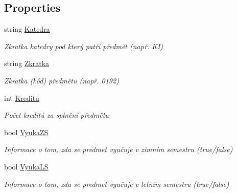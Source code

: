 \subsection*{Properties}
\begin{DoxyCompactItemize}
\item 
string \hyperlink{class_analyza_rozvrhu_1_1_s_t_a_g___classes_1_1_predmet_a8a428f94044d4bc4d27a93de9371af00}{Katedra}
\begin{DoxyCompactList}\small\item\em Zkratka katedry pod který patří předmět (např. KI) \end{DoxyCompactList}\item 
string \hyperlink{class_analyza_rozvrhu_1_1_s_t_a_g___classes_1_1_predmet_a8a979ce2d4b9f29e01189c3ccfff9dcb}{Zkratka}
\begin{DoxyCompactList}\small\item\em Zkratka (kód) předmětu (např. 0192) \end{DoxyCompactList}\item 
int \hyperlink{class_analyza_rozvrhu_1_1_s_t_a_g___classes_1_1_predmet_a6e33e18dd5aa2fb8f84c5a8add8ec951}{Kreditu}
\begin{DoxyCompactList}\small\item\em Počet kreditů za splnění předmětu \end{DoxyCompactList}\item 
bool \hyperlink{class_analyza_rozvrhu_1_1_s_t_a_g___classes_1_1_predmet_a05d470dbc4731440c47f20b49dffdc34}{Vyuka\+ZS}
\begin{DoxyCompactList}\small\item\em Informace o tom, zda se predmet vyučuje v zimním semestru (true/false) \end{DoxyCompactList}\item 
bool \hyperlink{class_analyza_rozvrhu_1_1_s_t_a_g___classes_1_1_predmet_ad2eb29ac9108bc34d12730af5b3e57b5}{Vyuka\+LS}
\begin{DoxyCompactList}\small\item\em Informace o tom, zda se predmet vyučuje v letním semestru (true/false) \end{DoxyCompactList}\item 

\end{DoxyCompactItemize}
